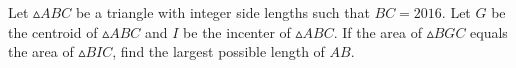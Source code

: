 Let $\vartriangle ABC$ be a triangle with integer side lengths such that $BC = 2016$. Let $G$ be the centroid of $\vartriangle ABC$ and $I$ be the incenter of $\vartriangle ABC$. If the area of $\vartriangle BGC$ equals the area of $\vartriangle BIC$, find the largest possible length of $AB$.